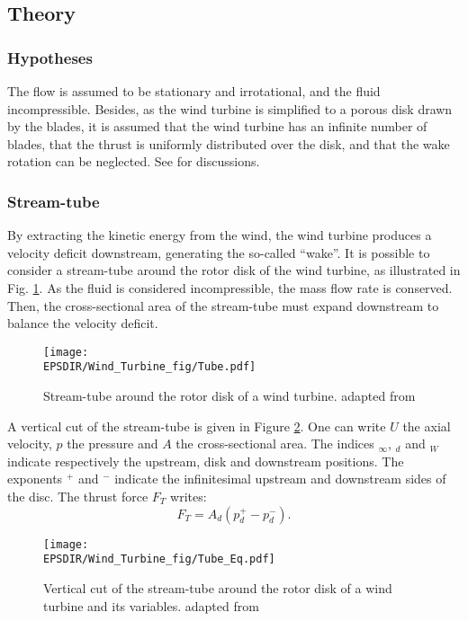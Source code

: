 \subsection{Theory}
\subsubsection*{Hypotheses}
\label{sss:ADNRhyp}
The flow is assumed to be stationary and irrotational, and the fluid incompressible. Besides, as the wind turbine is simplified to a porous disk drawn by the blades, it is assumed that the wind turbine has an infinite number of blades, that the thrust is uniformly distributed over the disk, and that the wake rotation can be neglected. See \citep{joulin2019modelisation} for discussions.

	
		\subsubsection*{Stream-tube}
				\label{sss:ADTubeC}

By extracting the kinetic energy from the wind, the wind turbine produces a velocity deficit downstream, generating the so-called ``wake''. It is possible to consider a stream-tube around the rotor disk of the wind turbine, as illustrated in Fig. \ref{fig:BEMTube3D}. As the fluid is considered incompressible, the mass flow rate is conserved. Then, the cross-sectional area of the stream-tube must expand downstream to balance the velocity deficit.
				
\begin{figure}[h]
\centering
\texttt{[image: \\EPSDIR/Wind\_Turbine\_fig/Tube.pdf]}
\caption{Stream-tube around the rotor disk of a wind turbine. \citet{joulin2019modelisation} adapted from \citet{burton2001wind}}  
\label{fig:BEMTube3D}
\end{figure}		
		
\medbreak
A vertical cut of the stream-tube is given in Figure \ref{fig:BEMTubeEq}. One can write $U$ the axial velocity, $p$ the pressure and $A$ the cross-sectional area. The indices $_\infty$, $_d$ and $_W$ indicate respectively the upstream, disk and downstream positions. The exponents $^+$ and $^-$ indicate the infinitesimal upstream and downstream sides of the disc. The thrust force $F_T$ writes:
\begin{equation}
\label{eq:FpDef}
F_T = A_d (p_d^+ - p_d^-).
\end{equation}		
\medbreak
\begin{figure}[h]
\centering
\texttt{[image: \\EPSDIR/Wind\_Turbine\_fig/Tube\_Eq.pdf]}
\caption{Vertical cut of the stream-tube around the rotor disk of a wind turbine and its variables. \citet{joulin2019modelisation} adapted from \citet{burton2001wind}}  
\label{fig:BEMTubeEq}
\end{figure}
\medbreak
	
